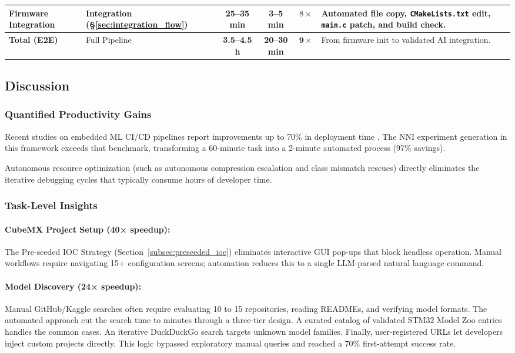 \begin{table}[htbp]
{\begin{tabular}{|l|l|c|c|c|p{5.5cm}|}
        \hline
        \textbf{Firmware Integration} & Integration (§\ref{sec:integration_flow})        & 25--35 min              & 3--5 min            & $8\times$           & Automated file copy, \texttt{CMakeLists.txt} edit, \texttt{main.c} patch, and build check. \\
        \hline\hline
        \textbf{Total (E2E)}   & Full Pipeline              & \textbf{3.5--4.5 h}    & \textbf{20--30 min} & $\mathbf{9\times}$  & From firmware init to validated AI integration. \\
        \hline
    \end{tabular}%
    }
\end{table}

\subsection{Discussion}

\subsubsection{Quantified Productivity Gains}

Recent studies on embedded ML CI/CD pipelines report improvements up to 70\% in deployment time \cite{embedded_ml_cicd_2025}. The NNI experiment generation in this framework exceeds that benchmark, transforming a 60-minute task into a 2-minute automated process (97\% savings).

Autonomous resource optimization (such as autonomous compression escalation and class mismatch rescues) directly eliminates the iterative debugging cycles that typically consume hours of developer time.

\subsubsection{Task-Level Insights}

\paragraph{CubeMX Project Setup (40× speedup):} The Pre-seeded IOC Strategy (Section~\ref{subsec:preseeded_ioc}) eliminates interactive GUI pop-ups that block headless operation. Manual workflows require navigating 15+ configuration screens; automation reduces this to a single LLM-parsed natural language command.

\paragraph{Model Discovery (24× speedup):} Manual GitHub/Kaggle searches often require evaluating 10 to 15 repositories, reading READMEs, and verifying model formats. The automated approach cut the search time to minutes through a three-tier design. A curated catalog of validated STM32 Model Zoo entries handles the common cases. An iterative DuckDuckGo search targets unknown model families. Finally, user-registered URLs let developers inject custom projects directly. This logic bypassed exploratory manual queries and reached a 70\% first-attempt success rate.

